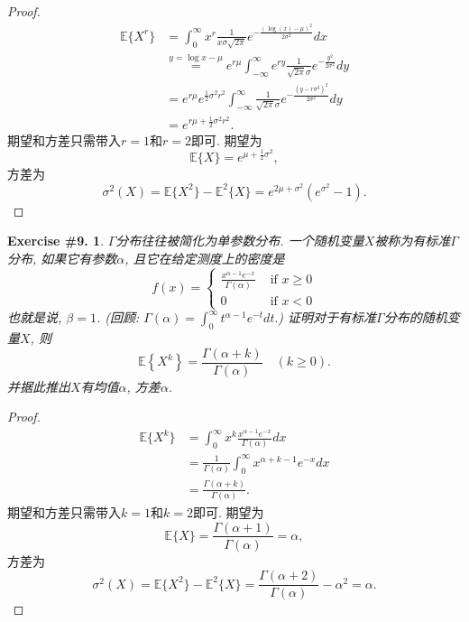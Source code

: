 \documentclass[UTF8, a4paper]{article}
\newtheorem{exercise}{Exercise \#9.}
\begin{document}
\begin{proof}
$$
\begin{aligned}
    \mathbb{E}\{X^r\} &= \int_{0}^{\infty} x^r \frac{1}{x\sigma\sqrt{2\pi}} e^{-\frac{(\log(x) - \mu)^2}{2\sigma^2}} dx \\
    &\overset{y = \log x - \mu}{=} e^{r\mu}\int_{-\infty}^{\infty} e^{r y} \frac{1}{\sqrt{2\pi}\sigma} e^{-\frac{y^2}{2\sigma^2}} dy \\
    &= e^{r\mu} e^{\frac{1}{2}\sigma^2 r^2} \int_{-\infty}^{\infty} \frac{1}{\sqrt{2\pi}\sigma} e^{-\frac{(y-r\sigma^2)^2}{2\sigma^2}} dy \\
    &= e^{r\mu + \frac{1}{2}\sigma^2 r^2}.
\end{aligned}
$$
期望和方差只需带入\(r=1\)和\(r=2\)即可.
期望为
$$
\mathbb{E}\{X\} = e^{\mu + \frac{1}{2}\sigma^2},
$$
方差为
$$
\sigma^2(X) = \mathbb{E}\{X^2\} - \mathbb{E}^2\{X\} = e^{2\mu + \sigma^2}\left(e^{\sigma^2} - 1\right).
$$
\end{proof}


\begin{framed}
\begin{exercise}
\(\Gamma\)分布往往被简化为单参数分布. 
一个随机变量\(X\)被称为有标准\(\Gamma\)分布, 如果它有参数\(\alpha\), 且它在给定测度上的密度是
$$
f(x)= \begin{cases}\frac{x^{\alpha-1} e^{-x}}{\Gamma(\alpha)} & \text { if } x \geq 0 \\ 0 & \text { if } x<0\end{cases}
$$
也就是说, \(\beta = 1\). (回顾: $\Gamma(\alpha)=\int_0^{\infty} t^{\alpha-1} e^{-t} d t.$) 证明对于有标准\(\Gamma\)分布的随机变量\(X\), 则
$$
\mathbb{E}\left\{X^k\right\}=\frac{\Gamma(\alpha+k)}{\Gamma(\alpha)} \quad(k \geq 0).
$$
并据此推出\(X\)有均值\(\alpha\), 方差\(\alpha\).
\end{exercise}
\end{framed}

\begin{proof}
$$
\begin{aligned}
    \mathbb{E}\{X^k\} &= \int_{0}^{\infty} x^k \frac{x^{\alpha-1} e^{-x}}{\Gamma(\alpha)} dx \\
    &= \frac{1}{\Gamma(\alpha)} \int_{0}^{\infty} x^{\alpha+k-1} e^{-x} dx \\
    &= \frac{\Gamma(\alpha+k)}{\Gamma(\alpha)}.
\end{aligned}
$$
期望和方差只需带入\(k=1\)和\(k=2\)即可.
期望为
$$
\mathbb{E}\{X\} = \frac{\Gamma(\alpha+1)}{\Gamma(\alpha)} = \alpha,
$$
方差为
$$
\sigma^2(X) = \mathbb{E}\{X^2\} - \mathbb{E}^2\{X\} = \frac{\Gamma(\alpha+2)}{\Gamma(\alpha)} - \alpha^2 = \alpha.
$$
\end{proof}
\end{document}
